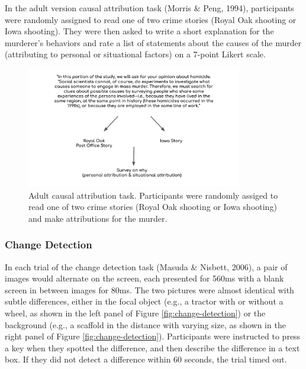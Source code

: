 \documentclass[
  man,floatsintext]{apa6}
\begin{document}
In the adult version causal attribution task (Morris \& Peng, 1994), participants were randomly assigned to read one of two crime stories (Royal Oak shooting or Iowa shooting). They were then asked to write a short explanation for the murderer's behaviors and rate a list of statements about the causes of the murder (attributing to personal or situational factors) on a 7-point Likert scale.

\begin{figure}[!h]

{\centering \includegraphics[width=1\linewidth,height=200px]{CCRR_manuscript_files/appendix_task_examples/e2_ca_adult} 

}

\caption{Adult causal attribution task. Participants were randomly assiged to read one of two crime stories (Royal Oak shooting or Iowa shooting) and make attributions for the murder.}\label{fig:ca-adult}
\end{figure}

\hypertarget{change-detection-2}{%
\subsubsection{Change Detection}\label{change-detection-2}}

In each trial of the change detection task (Masuda \& Nisbett, 2006), a pair of images would alternate on the screen, each presented for 560ms with a blank screen in between images for 80ms. The two pictures were almost identical with subtle differences, either in the focal object (e.g., a tractor with or without a wheel, as shown in the left panel of Figure \ref{fig:change-detection}) or the background (e.g., a scaffold in the distance with varying size, as shown in the right panel of Figure \ref{fig:change-detection}). Participants were instructed to press a key when they spotted the difference, and then describe the difference in a text box. If they did not detect a difference within 60 seconds, the trial timed out.
\end{document}
